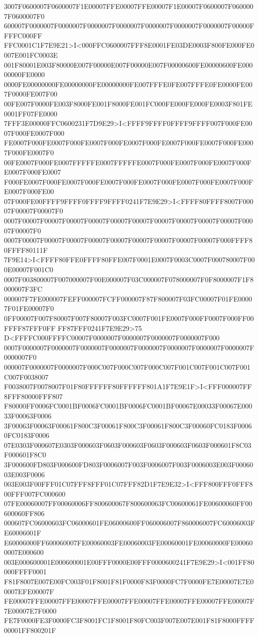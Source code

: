 3007F0600007F0600007F1E00007FFE00007FFE00007F1E00007F0600007F0600007F0600007F0
600007F0000007F0000007F0000007F0000007F0000007F0000007F0000007F00000FFFFC000FF
FFC0001C1F7E9E21>I<000FFC0600007FFF8E0001FE03DE0003F800FE000FE0007E001FC0003E
001F80001E003F80000E007F00000E007F00000E007F00000600FE00000600FE00000000FE0000
0000FE00000000FE00000000FE00000000FE007FFFE0FE007FFFE0FE0000FE007F0000FE007F00
00FE007F0000FE003F8000FE001F8000FE001FC000FE000FE000FE0003F801FE0001FF07FE0000
7FFF3E00000FFC0600231F7D9E29>I<FFFF9FFFF0FFFF9FFFF007F000FE0007F000FE0007F000
FE0007F000FE0007F000FE0007F000FE0007F000FE0007F000FE0007F000FE0007F000FE0007F0
00FE0007F000FE0007FFFFFE0007FFFFFE0007F000FE0007F000FE0007F000FE0007F000FE0007
F000FE0007F000FE0007F000FE0007F000FE0007F000FE0007F000FE0007F000FE0007F000FE00
07F000FE00FFFF9FFFF0FFFF9FFFF0241F7E9E29>I<FFFF80FFFF8007F00007F00007F00007F0
0007F00007F00007F00007F00007F00007F00007F00007F00007F00007F00007F00007F00007F0
0007F00007F00007F00007F00007F00007F00007F00007F00007F00007F000FFFF80FFFF80111F
7F9E14>I<FFFF80FFE0FFFF80FFE007F0001E0007F0003C0007F000780007F000E00007F001C0
0007F003800007F007000007F00E000007F03C000007F078000007F0F8000007F1F8000007F3FC
000007F7FE000007FEFF000007FCFF000007F87F800007F03FC00007F01FE00007F01FE00007F0
0FF00007F007F80007F007F80007F003FC0007F001FE0007F000FF0007F000FF00FFFF87FFF0FF
FF87FFF0241F7E9E29>75 D<FFFFC000FFFFC00007F0000007F0000007F0000007F0000007F000
0007F0000007F0000007F0000007F0000007F0000007F0000007F0000007F0000007F0000007F0
000007F0000007F0000007F000C007F000C007F000C007F001C007F001C007F001C007F0038007
F0038007F0078007F01F80FFFFFF80FFFFFF801A1F7E9E1F>I<FFF000007FF8FFF80000FFF807
F80000FF0006FC0001BF0006FC0001BF0006FC0001BF00067E00033F00067E00033F00063F0006
3F00063F00063F00061F800C3F00061F800C3F00061F800C3F00060FC0183F00060FC0183F0006
07E0303F000607E0303F000603F0603F000603F0603F000603F0603F000601F8C03F000601F8C0
3F000600FD803F000600FD803F0006007F003F0006007F003F0006003E003F0006003E003F0006
003E003F00FFF01C07FFF8FFF01C07FFF82D1F7E9E32>I<FFF800FFF0FFF800FFF007FC000600
07FE00060007FF00060006FF800600067F800600063FC00600061FE00600060FF00600060FF806
000607FC06000603FC06000601FE06000600FF060006007F860006007FC60006003FE60006001F
E60006000FF600060007FE00060003FE00060003FE00060001FE00060000FE000600007E000600
003E000600001E000600001E00FFF0000E00FFF0000600241F7E9E29>I<001FF80000FFFF0001
F81F8007E007E00FC003F01F8001F81F0000F83F0000FC7F0000FE7E00007E7E00007EFE00007F
FE00007FFE00007FFE00007FFE00007FFE00007FFE00007FFE00007FFE00007F7E00007E7F0000
FE7F0000FE3F0000FC3F8001FC1F8001F80FC003F007E007E001F81F8000FFFF00001FF800201F
